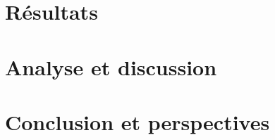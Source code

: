 \documentclass[12pt,a4paper]{report}
\begin{document}
\chapter{Résultats}
\label{chap:Résultats}


\chapter{Analyse et discussion}
\label{chap:Analyse_et_discussion}

\chapter{Conclusion et perspectives}
\label{chap:Conclusion_et_perspectives}






 
\end{document}
